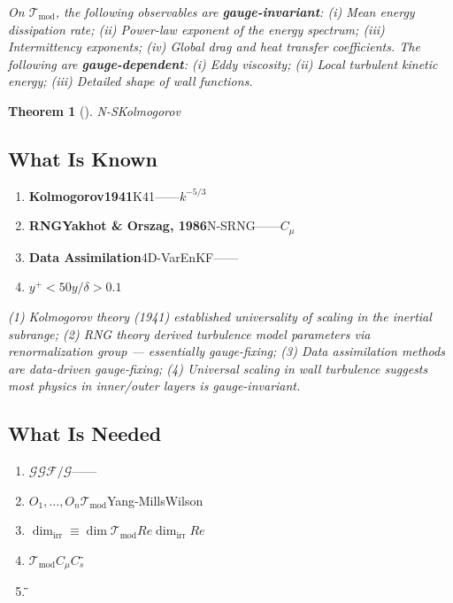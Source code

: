 \documentclass[12pt,a4paper]{article}
\newtheorem{theorem}{Theorem}[section]
\theoremstyle{remark}
\newcommand{\G}{\mathcal{G}}
\newcommand{\T}{\mathcal{T}}
\newcommand{\F}{\mathcal{F}}
\begin{document}
\medskip
\noindent\textit{On $\T_{\text{mod}}$, the following observables are \textbf{gauge-invariant}: (i) Mean energy dissipation rate; (ii) Power-law exponent of the energy spectrum; (iii) Intermittency exponents; (iv) Global drag and heat transfer coefficients. The following are \textbf{gauge-dependent}: (i) Eddy viscosity; (ii) Local turbulent kinetic energy; (iii) Detailed shape of wall functions.}

\begin{theorem}[]
N-SKolmogorov
\end{theorem}

\subsection{ What Is Known}

\begin{enumerate}[label=(\arabic*)]
    \item \textbf{Kolmogorov1941}K41——$k^{-5/3}$
    
    \item \textbf{RNGYakhot \& Orszag, 1986}N-SRNG——$C_\mu$
    
    \item \textbf{Data Assimilation}4D-VarEnKF\textbf{}——
    
    \item \textbf{}$y^+ < 50$$y/\delta > 0.1$
\end{enumerate}

\medskip
\noindent\textit{(1) Kolmogorov theory (1941) established universality of scaling in the inertial subrange; (2) RNG theory derived turbulence model parameters via renormalization group — essentially gauge-fixing; (3) Data assimilation methods are data-driven gauge-fixing; (4) Universal scaling in wall turbulence suggests most physics in inner/outer layers is gauge-invariant.}

\subsection{ What Is Needed}

\begin{enumerate}[label=(\arabic*)]
    \item \textbf{$\G$}$\G$$\F/\G$——
    
    \item \textbf{}${O_1, \ldots, O_n}$$\T_{\text{mod}}$Yang-MillsWilson
    
    \item \textbf{}$\dim_{\text{irr}} \equiv \dim \T_{\text{mod}}$$Re$$\dim_{\text{irr}}$$Re$
    
    \item \textbf{}$\T_{\text{mod}}$$C_\mu$$C_s$\"\"
    
    \item \textbf{}\"\"
\end{enumerate}
\end{document}
